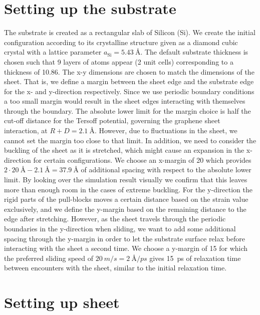 \section{Setting up the substrate}\label{sec:substrate}
The substrate is created as a rectangular slab of Silicon (Si). We create the
initial configuration according to its crystalline structure given as a diamond
cubic crystal with a lattice parameter $a_{\text{Si}} = \SI{5.43}{\text{Å}}$.
The default substrate thickness is chosen such that 9 layers of atoms appear (2
unit cells) corresponding to a thickness of \SI{10.86}{}. The x-y
dimensions are chosen to match the dimensions of the sheet. That is, we define a
margin between the sheet edge and the substrate edge for the x- and y-direction
respectively. Since we use periodic boundary conditions a too small margin would
result in the sheet edges interacting with themselves through the boundary. The
absolute lower limit for the margin choice is half the cut-off distance for
the Tersoff potential, governing the graphene sheet interaction, at $R + D =
\SI{2.1}{\text{Å}}$. However, due to fluctuations in the sheet, we cannot set the margin too
close to that limit. In addition, we need to consider the buckling of the sheet as it is stretched, which might cause an expansion in the x-direction for certain configurations. We choose an x-margin of \SI{20}{} which provides $2\cdot
\SI{20}{\text{Å}} - \SI{2.1}{\text{Å}} = \SI{37.9}{\text{Å}}$ of additional
spacing with respect to the absolute lower limit. By looking over the simulation
result visually we confirm that this leaves more than enough room in the cases
of extreme buckling. For the y-direction the rigid parts of the pull-blocks
moves a certain distance based on the strain value exclusively, and we define
the y-margin based on the remaining distance to the edge after stretching.
However, as the sheet travels through the periodic boundaries in the y-direction
when sliding, we want to add some additional spacing through the y-margin in
order to let the substrate surface relax before interacting with the sheet a
second time. We choose a y-margin of \SI{15}{} for which the preferred sliding speed
of $\SI{20}{m/s} = \SI{2}{\text{Å}/ps}$ gives \SI{15}{ps} of relaxation time
between encounters with the sheet, similar to the initial relaxation time. 


\section{Setting up sheet}


